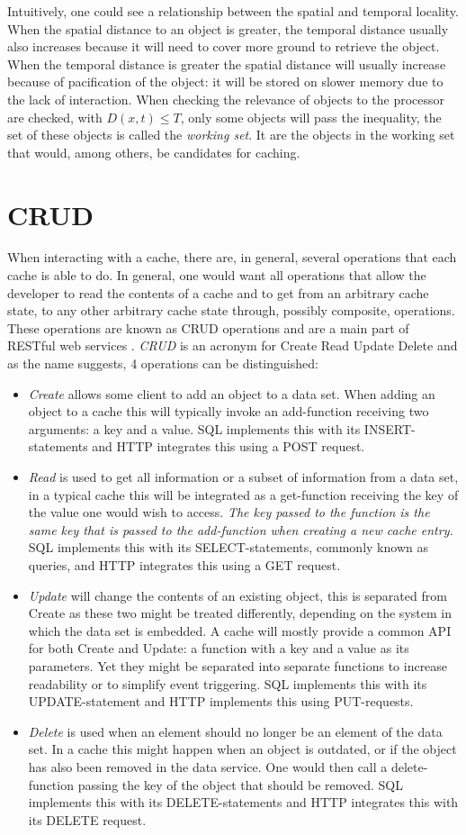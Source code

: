 \documentclass[pdftex,a4paper,12pt,twoside]{report}
\begin{document}
Intuitively, one could see a relationship between the spatial and temporal locality. When the spatial distance to an object is greater, the temporal distance usually also increases because it will need to cover more ground to retrieve the object. When the temporal distance is greater the spatial distance will usually increase because of pacification of the object: it will be stored on slower memory due to the lack of interaction.
When checking the relevance of objects to the processor are checked, with $D(x,t) \leq T$, only some objects will pass the inequality, the set of these objects is 
called the \emph{working set}. It are the objects in the working set that would, among others, be candidates for caching. 
\section{CRUD}
When interacting with a cache, there are, in general, several operations that each cache is able to do. In general, one would want all operations that allow the developer to read the contents of a cache and to get from an arbitrary cache state, to any other arbitrary cache state through, possibly composite, operations. These operations are known as CRUD operations and are a main part of RESTful web services \citep{battle2008bridging}.
\emph{CRUD} is an acronym for Create Read Update Delete and as the name suggests, 4 operations can be distinguished:
\begin{itemize}
\item \emph{Create} allows some client to add an object to a data set. When adding an object to a cache this will typically invoke an add-function receiving two arguments: a key and a value. SQL implements this with its INSERT-statements and HTTP integrates this using a POST request.
\item \emph{Read} is used to get all information or a subset of information from a data set, in a typical cache this will be integrated as a get-function receiving
the key of the value one would wish to access. \emph{The key passed to the function is the same key that is passed to the add-function when creating a new cache entry.} SQL implements this with its SELECT-statements, commonly known as queries, and HTTP integrates this using a GET request.
\item \emph{Update} will change the contents of an existing object, this is separated from Create as these two might be treated differently, depending on the system in which the data set is embedded. A cache will mostly provide a common API for both Create and Update: a function with a key and a value as its parameters. Yet they might be separated into separate functions to increase readability or to simplify event triggering. SQL implements this with its UPDATE-statement and HTTP implements this using PUT-requests.
\item \emph{Delete} is used when an element should no longer be an element of the data set. In a cache this might happen when an object is outdated, or if the object has also been removed in the data service. One would then call a delete-function passing the key of the object that should be removed. SQL implements this with its DELETE-statements and HTTP integrates this with its DELETE request.
\end{itemize}
\end{document}
